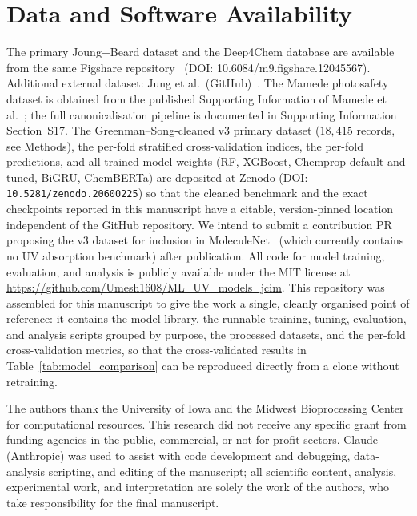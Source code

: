 \documentclass[journal=jcisd8,manuscript=article]{achemso}
\begin{document}
\section*{Data and Software Availability}
The primary Joung+Beard dataset and the Deep4Chem database are available from the same Figshare repository~\cite{joung2020experimental, beard2019comparative} (DOI: 10.6084/m9.figshare.12045567).
Additional external dataset: Jung et al.\ (GitHub)~\cite{jung2024machine}.
The Mamede photosafety dataset is obtained from the published Supporting Information of Mamede et al.~\cite{mamede2021machine}; the full canonicalisation pipeline is documented in Supporting Information Section~S17.
The Greenman--Song-cleaned v3 primary dataset ($18{,}415$ records, see Methods), the per-fold stratified cross-validation indices, the per-fold predictions, and all trained model weights (RF, XGBoost, Chemprop default and tuned, BiGRU, ChemBERTa) are deposited at Zenodo (DOI: \texttt{10.5281/zenodo.20600225}) so that the cleaned benchmark and the exact checkpoints reported in this manuscript have a citable, version-pinned location independent of the GitHub repository. We intend to submit a contribution PR proposing the v3 dataset for inclusion in MoleculeNet~\cite{wuMoleculeNet2018} (which currently contains no UV absorption benchmark) after publication. All code for model training, evaluation, and analysis is publicly available under the MIT license at \url{https://github.com/Umesh1608/ML_UV_models_jcim}. This repository was assembled for this manuscript to give the work a single, cleanly organised point of reference: it contains the model library, the runnable training, tuning, evaluation, and analysis scripts grouped by purpose, the processed datasets, and the per-fold cross-validation metrics, so that the cross-validated results in Table~\ref{tab:model_comparison} can be reproduced directly from a clone without retraining.


\begin{acknowledgement}
The authors thank the University of Iowa and the Midwest Bioprocessing Center for computational resources.
This research did not receive any specific grant from funding agencies in the public, commercial, or not-for-profit sectors.
Claude (Anthropic) was used to assist with code development and debugging, data-analysis scripting, and editing of the manuscript; all scientific content, analysis, experimental work, and interpretation are solely the work of the authors, who take responsibility for the final manuscript.
\end{acknowledgement}
\end{document}
